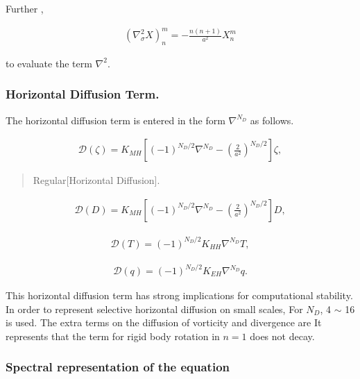 Further ,

\begin{eqnarray}
     \left( \nabla^{2}_{\sigma} X \right)_n^m
       =  - \frac{n(n+1)}{a^{2}} X_n^m
\end{eqnarray}

to evaluate the term \(\nabla^2\).

\hypertarget{horizontal-diffusion-term.}{%
\subsubsection{Horizontal Diffusion
Term.}\label{horizontal-diffusion-term.}}

The horizontal diffusion term is entered in the form \(\nabla^{N_D}\) as
follows.

\begin{eqnarray}
  {\mathcal D}(\zeta) = K_{MH} 
                      \left[ (-1)^{N_D/2} \nabla^{N_D}
                              - \left( \frac{2}{a^2} \right)^{N_D/2} 
                      \right]
                    \zeta ,
\end{eqnarray}

\begin{quote}
\protect\hypertarget{Horizontalux20Diffusion}{}{Regular{[}Horizontal
Diffusion{]}}.
\end{quote}

\begin{eqnarray}
     {\mathcal D}(D) = K_{MH} 
                      \left[ (-1)^{N_D/2} \nabla^{N_D}
                              - \left( \frac{2}{a^2} \right)^{N_D/2} 
                      \right]
                    D ,
\end{eqnarray}

\begin{eqnarray}
    {\mathcal D}(T) = (-1)^{N_D/2} K_{HH} \nabla^{N_D} T ,
\end{eqnarray}

\begin{eqnarray}
    {\mathcal D}(q) = (-1)^{N_D/2} K_{EH} \nabla^{N_D} q .
\end{eqnarray}

This horizontal diffusion term has strong implications for computational
stability. In order to represent selective horizontal diffusion on small
scales, For \(N_D\), 4 \(\sim\) 16 is used. The extra terms on the
diffusion of vorticity and divergence are It represents that the term
for rigid body rotation in \(n=1\) does not decay.

\hypertarget{spectral-representation-of-the-equation}{%
\subsubsection{Spectral representation of the
equation}\label{spectral-representation-of-the-equation}}

